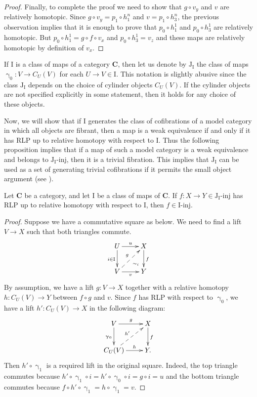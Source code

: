 \documentclass{tac}
\theoremstyle{definition}
\newcommand{\cat}[1]{\mathbf{#1}}
\newcommand{\C}{\cat{C}}
\newcommand{\I}{\mathrm{I}}
\newcommand{\J}{\mathrm{J}}
\newcommand{\class}[2]{#1\text{-}\mathrm{#2}}
\newcommand{\Iinj}[1][\I]{\class{#1}{inj}}
\newcommand{\Jinj}[1][]{\Iinj[\J#1]}
\newcommand{\cyli}{\upgamma}
\begin{document}
\begin{proof}
Finally, to complete the proof we need to show that $g \circ v_y$ and $v$ are relatively homotopic.
Since $g \circ v_y = p_1 \circ h^n_1$ and $v = p_1 \circ h^n_3$, the previous observation implies that it is enough to prove that $p_0 \circ h^1_1$ and $p_0 \circ h^1_3$ are relatively homotopic.
But $p_0 \circ h^1_1 = g \circ f \circ v_x$ and $p_0 \circ h^1_3 = v_z$ and these maps are relatively homotopic by definition of $v_x$.
\end{proof}

If $\I$ is a class of maps of a category $\C$, then let us denote by $\J_\I$ the class of maps $\cyli_0 : V \to C_U(V)$ for each $U \to V \in \I$.
This notation is slightly abusive since the class $\J_\I$ depends on the choice of cylinder objects $C_U(V)$.
If the cylinder objects are not specified explicitly in some statement, then it holds for any choice of these objects.

Now, we will show that if $\I$ generates the class of cofibrations of a model category in which all objects are fibrant,
then a map is a weak equivalence if and only if it has RLP up to relative homotopy with respect to $\I$.
Thus the following proposition implies that if a map of such a model category is a weak equivalence and belongs to $\Jinj[_\I]$, then it is a trivial fibration.
This implies that $\J_\I$ can be used as a set of generating trivial cofibrations if it permits the small object argument (see ).

\begin{prop}
Let $\C$ be a category, and let $\I$ be a class of maps of $\C$.
If $f : X \to Y \in \Jinj[_\I]$ has RLP up to relative homotopy with respect to $\I$, then $f \in \Iinj$.
\end{prop}
\begin{proof}
Suppose we have a commutative square as below.
We need to find a lift $V \to X$ such that both triangles commute.
\[ \xymatrix{ U \ar[d]_{i \in \I} \ar[r]^u \ar@{}[dr]|(.7){\sim_i} & X \ar[d]^f \\
              V \ar[r]_v \ar@{-->}[ur]^g                           & Y
            } \]
By assumption, we have a lift $g : V \to X$ together with a relative homotopy $h : C_U(V) \to Y$ between $f \circ g$ and $v$.
Since $f$ has RLP with respect to $\cyli_0$, we have a lift $h' : C_U(V) \to X$ in the following diagram:
\[ \xymatrix{ V \ar[r]^g \ar[d]_{\cyli_0}         & X \ar[d]^f \\
              C_U(V) \ar[r]^-h \ar@{-->}[ur]^{h'} & Y.
            } \]
Then $h' \circ \cyli_1$ is a required lift in the original square.
Indeed, the top triangle commutes because $h' \circ \cyli_1 \circ i = h' \circ \cyli_0 \circ i = g \circ i = u$ and the bottom triangle commutes because $f \circ h' \circ \cyli_1 = h \circ \cyli_1 = v$.
\end{proof}
\end{document}
